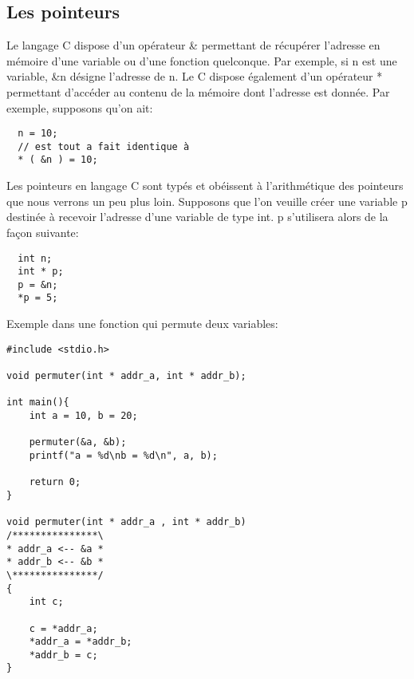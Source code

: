 \documentclass[a4paper]{article}
\begin{document}
\subsection{Les pointeurs}
Le langage C dispose d'un opérateur \guillemotleft{}\&\guillemotright{} permettant de récupérer l'adresse en mémoire d'une variable ou d'une fonction quelconque. Par exemple, si n est une variable, \&n désigne l'adresse de n. \newline
Le C dispose également d'un opérateur \guillemotleft{}*\guillemotright{} permettant d'accéder au contenu de la mémoire dont l'adresse est donnée. Par exemple, supposons qu'on ait:
\begin{lstlisting}
  n = 10;
  // est tout a fait identique à
  * ( &n ) = 10;
\end{lstlisting}
Les pointeurs en langage C sont typés et obéissent à l'arithmétique des pointeurs que nous verrons un peu plus loin. Supposons que l'on veuille créer une variable \guillemotleft{} p \guillemotright{} destinée à recevoir l'adresse d'une variable de type int. \guillemotleft{} p \guillemotright{} s'utilisera alors de la façon suivante:
\begin{lstlisting}
  int n;
  int * p;
  p = &n;
  *p = 5;
\end{lstlisting}
Exemple dans une fonction qui permute deux variables:
\begin{lstlisting}
#include <stdio.h>

void permuter(int * addr_a, int * addr_b);

int main(){
    int a = 10, b = 20;

    permuter(&a, &b);
    printf("a = %d\nb = %d\n", a, b);

    return 0;
}

void permuter(int * addr_a , int * addr_b)
/***************\
* addr_a <-- &a *
* addr_b <-- &b *
\***************/
{
    int c;

    c = *addr_a;
    *addr_a = *addr_b;
    *addr_b = c;
}
\end{lstlisting}
\end{document}
